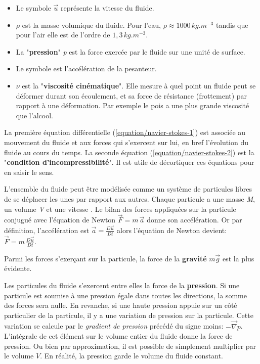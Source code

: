 \documentclass[11pt]{article}
\begin{document}
\begin{itemize}
	\item Le symbole $ \overrightarrow{u} $ représente la vitesse du fluide.
	\item $  \rho $ est la masse volumique du fluide. Pour l'eau, $ \rho \approx 1000\,kg.m^{-3} $ tandis que pour l'air elle est de l'ordre de $ 1,3\,kg.m^{-3} $.
	\item La "\textbf{pression}" \textit{p} est la force exercée par le fluide sur une unité de surface.
	\item Le symbole  est l'accélération de la pesanteur.
	\item $\nu$ est la "\textbf{viscosité cinématique}". Elle mesure à quel point un fluide peut se déformer durant son écoulement, et sa force de résistance (frottement) par rapport à une déformation. Par exemple le pois a une plus grande viscosité que l'alcool.
\end{itemize}

La première équation différentielle (\ref{equation/navier-stokes-1}) est associée au mouvement du fluide et aux forces qui s'exercent sur lui, en bref l'évolution du fluide au cours du temps. La seconde équation (\ref{equation/navier-stokes-2}) est la "\textbf{condition d'incompressibilité}". Il est utile de décortiquer ces équations pour en saisir le sens.

L'ensemble du fluide peut être modélisée comme un système de particules libres de se déplacer les unes par rapport aux autres. Chaque particule a une masse \textit{M}, un volume \textit{V} et une vitesse . Le bilan des forces appliquées sur la particule conjugué avec l'équation de Newton $ \overrightarrow{F} = m\, \overrightarrow{a} $ donne son accélération. Or par définition, l'accélération est $\overrightarrow{a} = \frac{D \overrightarrow{u}}{Dt}$ alors l'équation de Newton devient: $\overrightarrow{F} = m\, \frac{D \overrightarrow{u}}{Dt}$.

Parmi les forces s'exerçant sur la particule, la force de la \textbf{gravité} $ m\overrightarrow{g} $ est la plus évidente. 

Les particules du fluide s'exercent entre elles la force de la \textbf{pression}. Si une particule est soumise à une pression égale dans toutes les directions, la somme des forces sera nulle. En revanche, si une haute pression appuie sur un côté particulier de la particule, il y a une variation de pression sur la particule. Cette variation se calcule par le \textit{gradient de pression} précédé du signe moins: $ - \overrightarrow{\nabla} p $.
L'intégrale de cet élément sur le volume entier du fluide donne la force de pression. Ou bien par approximation, il est possible de simplement multiplier par le volume $V$. En réalité, la pression garde le volume du fluide constant.
\end{document}
